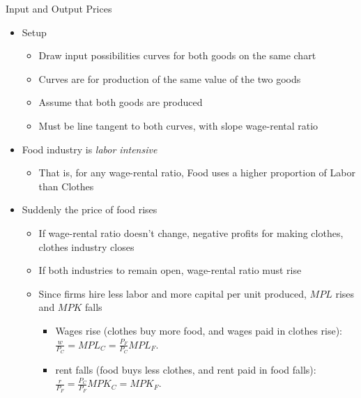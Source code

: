 \documentclass[ignorenonframetext,]{beamer}
\begin{document}
\begin{frame}{Input and Output Prices}

    \begin{itemize}
        \item Setup
        \begin{itemize}
            \item Draw input possibilities curves for both goods on the same chart 
            \item Curves are for production of the same value of the two goods 
            \item Assume that both goods are produced
            \item Must be line tangent to both curves, with slope wage-rental ratio
        \end{itemize}
        \item Food industry is \emph{labor intensive}
            \begin{itemize}
        \item That is, for any wage-rental ratio, Food uses a higher proportion of Labor than Clothes
            \end{itemize}
        \item Suddenly the price of food rises
        \begin{itemize}
            \item If wage-rental ratio doesn't change, negative profits for making clothes, clothes industry closes
            \item If both industries to remain open, wage-rental ratio must rise
            \item Since firms hire less labor and more capital per unit produced, $MPL$ rises and $MPK$ falls
            \begin{itemize}
                \item Wages rise (clothes buy more food, and wages paid in clothes rise): $\frac{w}{P_C} = MPL_C = \frac{P_F}{P_C} MPL_F$.  
                \item rent falls (food buys less clothes, and rent paid in food falls): $\frac{r}{P_F} = \frac{P_C}{P_F} MPK_C = MPK_F$.  
            \end{itemize}
        \end{itemize}

    \end{itemize}

\end{frame}
\end{document}

